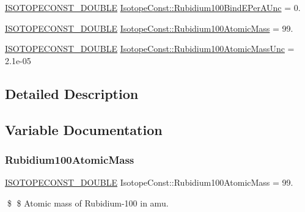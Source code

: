 \begin{DoxyCompactItemize}
\mbox{\hyperlink{group___isotope_const-_macros_ga8f45a7272ce02c0b4c65c44636ed719a}{I\+S\+O\+T\+O\+P\+E\+C\+O\+N\+S\+T\+\_\+\+D\+O\+U\+B\+LE}} \mbox{\hyperlink{group___isotope_const-_rubidium-_rb100_gac4d08eedbff23b03c733be8b4b73ab94}{Isotope\+Const\+::\+Rubidium100\+Bind\+E\+Per\+A\+Unc}} = 0.
\item 
\mbox{\hyperlink{group___isotope_const-_macros_ga8f45a7272ce02c0b4c65c44636ed719a}{I\+S\+O\+T\+O\+P\+E\+C\+O\+N\+S\+T\+\_\+\+D\+O\+U\+B\+LE}} \mbox{\hyperlink{group___isotope_const-_rubidium-_rb100_ga97ba4014764ed9e0232a6b439afb5ae5}{Isotope\+Const\+::\+Rubidium100\+Atomic\+Mass}} = 99.
\item 
\mbox{\hyperlink{group___isotope_const-_macros_ga8f45a7272ce02c0b4c65c44636ed719a}{I\+S\+O\+T\+O\+P\+E\+C\+O\+N\+S\+T\+\_\+\+D\+O\+U\+B\+LE}} \mbox{\hyperlink{group___isotope_const-_rubidium-_rb100_ga874e3e94a572ad8881981490004905c5}{Isotope\+Const\+::\+Rubidium100\+Atomic\+Mass\+Unc}} = 2.\+1e-\/05
\end{DoxyCompactItemize}


\subsection{Detailed Description}


\subsection{Variable Documentation}
\mbox{\label{group___isotope_const-_rubidium-_rb100_ga97ba4014764ed9e0232a6b439afb5ae5}} 
\subsubsection{\texorpdfstring{Rubidium100\+Atomic\+Mass}{Rubidium100AtomicMass}}
{\footnotesize\ttfamily \mbox{\hyperlink{group___isotope_const-_macros_ga8f45a7272ce02c0b4c65c44636ed719a}{I\+S\+O\+T\+O\+P\+E\+C\+O\+N\+S\+T\+\_\+\+D\+O\+U\+B\+LE}} Isotope\+Const\+::\+Rubidium100\+Atomic\+Mass = 99.}

\$ \$ Atomic mass of Rubidium-\/100 in amu. \mbox{\label{group___isotope_const-_rubidium-_rb100_ga874e3e94a572ad8881981490004905c5}} 
